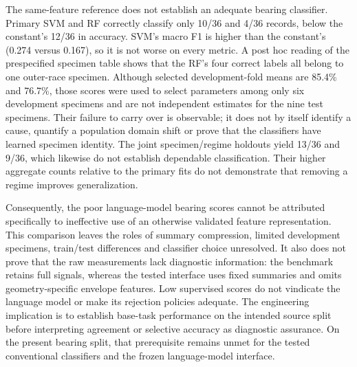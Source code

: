 \documentclass[11pt,a4paper]{article}
\begin{document}
The same-feature reference does not establish an adequate bearing classifier. Primary SVM and RF correctly classify only 10/36 and 4/36 records, below the constant's 12/36 in accuracy. SVM's macro F1 is higher than the constant's (0.274 versus 0.167), so it is not worse on every metric. A post hoc reading of the prespecified specimen table shows that the RF's four correct labels all belong to one outer-race specimen. Although selected development-fold means are 85.4\% and 76.7\%, those scores were used to select parameters among only six development specimens and are not independent estimates for the nine test specimens. Their failure to carry over is observable; it does not by itself identify a cause, quantify a population domain shift or prove that the classifiers have learned specimen identity. The joint specimen/regime holdouts yield 13/36 and 9/36, which likewise do not establish dependable classification. Their higher aggregate counts relative to the primary fits do not demonstrate that removing a regime improves generalization.

Consequently, the poor language-model bearing scores cannot be attributed specifically to ineffective use of an otherwise validated feature representation. This comparison leaves the roles of summary compression, limited development specimens, train/test differences and classifier choice unresolved. It also does not prove that the raw measurements lack diagnostic information: the benchmark retains full signals, whereas the tested interface uses fixed summaries and omits geometry-specific envelope features. Low supervised scores do not vindicate the language model or make its rejection policies adequate. The engineering implication is to establish base-task performance on the intended source split before interpreting agreement or selective accuracy as diagnostic assurance. On the present bearing split, that prerequisite remains unmet for the tested conventional classifiers and the frozen language-model interface.

\FloatBarrier
\begingroup
\small\raggedright
{}


\endgroup
\end{document}
